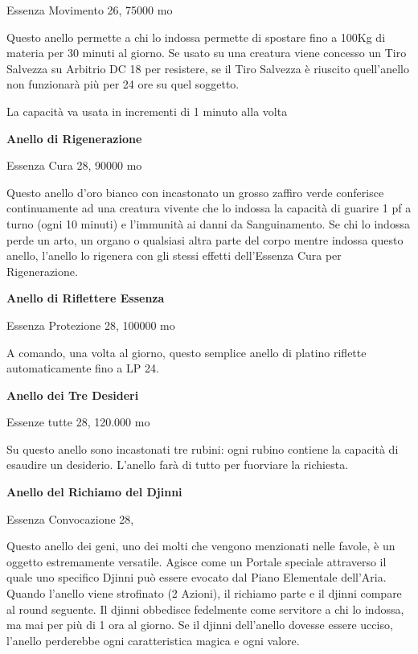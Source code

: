\documentclass[a4paper,11pt,twoside,openany]{book}
\begin{document}
{Essenza Movimento 26, 75000 mo

Questo anello permette a chi lo indossa permette di spostare fino a 100Kg di materia per 30 minuti al giorno. Se usato su una creatura viene concesso un Tiro Salvezza su Arbitrio DC 18 per resistere, se il Tiro Salvezza è riuscito quell'anello non funzionarà più per 24 ore su quel soggetto.

La capacità va usata in incrementi di 1 minuto alla volta

\textbf{Anello di Rigenerazione}

Essenza Cura 28, 90000 mo

Questo anello d'oro bianco con incastonato un grosso zaffiro verde conferisce continuamente ad una creatura vivente che lo indossa la capacità di guarire 1 pf a turno (ogni 10 minuti) e l'immunità ai danni da Sanguinamento. Se chi lo indossa perde un arto, un organo o qualsiasi altra parte del corpo mentre indossa questo anello, l'anello lo rigenera con gli stessi effetti dell'Essenza Cura per Rigenerazione.

\textbf{Anello di Riflettere Essenza}

Essenza Protezione 28, 100000 mo

A comando, una volta al giorno, questo semplice anello di platino riflette automaticamente fino a LP 24.

\textbf{Anello dei Tre Desideri}

Essenze tutte 28, 120.000 mo

Su questo anello sono incastonati tre rubini: ogni rubino contiene la capacità di esaudire un desiderio. L'anello farà di tutto per fuorviare la richiesta.

\textbf{Anello del Richiamo del Djinni}

Essenza Convocazione 28,

Questo anello dei geni, uno dei molti che vengono menzionati nelle favole, è un oggetto estremamente versatile. Agisce come un Portale speciale attraverso il quale uno specifico Djinni può essere evocato dal Piano Elementale dell'Aria. Quando l'anello viene strofinato (2 Azioni), il richiamo parte e il djinni compare al round seguente. Il djinni obbedisce fedelmente come servitore a chi lo indossa, ma mai per più di 1 ora al giorno. Se il djinni dell'anello dovesse essere ucciso, l'anello perderebbe ogni caratteristica magica e ogni valore.

}
\end{document}
